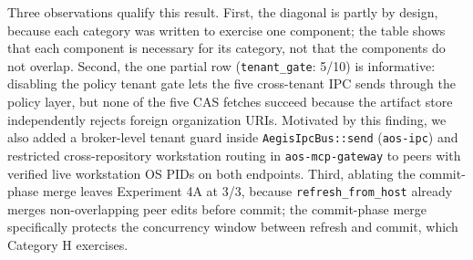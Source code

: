 \documentclass[acmsmall,screen,review]{acmart}
\begin{document}
Three observations qualify this result. First, the diagonal is partly by design, because each category was written to exercise one component; the table shows that each component is necessary for its category, not that the components do not overlap. Second, the one partial row (\texttt{tenant\_gate}: 5/10) is informative: disabling the policy tenant gate lets the five cross-tenant IPC sends through the policy layer, but none of the five CAS fetches succeed because the artifact store independently rejects foreign organization URIs. Motivated by this finding, we also added a broker-level tenant guard inside \texttt{AegisIpcBus::send} (\texttt{aos-ipc}) and restricted cross-repository workstation routing in \texttt{aos-mcp-gateway} to peers with verified live workstation OS PIDs on both endpoints. Third, ablating the commit-phase merge leaves Experiment 4A at 3/3, because \texttt{refresh\_from\_host} already merges non-overlapping peer edits before commit; the commit-phase merge specifically protects the concurrency window between refresh and commit, which Category H exercises.

\begin{table}[!t]
\centering
\caption{\textbf{Experiment 6 (RQ6): Component Ablation.} Attacks (out of 10 per category) that compromise Aegis OS when a single component is switched off in a test-only build (\texttt{scripts/e5\_ablation.py}); identical on macOS and Linux. The first row is the full system.}
\label{tab:ablation}
\vspace{2pt}
\end{table}
\end{document}
